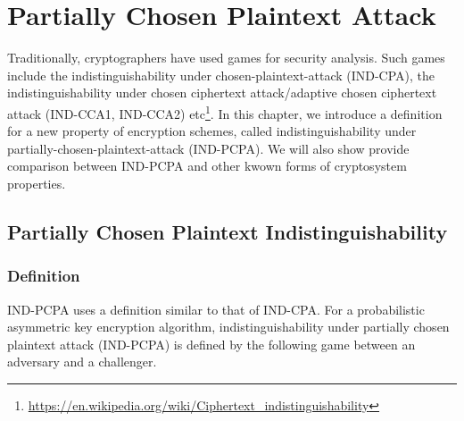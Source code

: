 \chapter{Partially Chosen Plaintext Attack}\label{ch:pcpa}

Traditionally, cryptographers have used games for security analysis. Such games include the indistinguishability under chosen-plaintext-attack (IND-CPA), the indistinguishability under chosen ciphertext attack/adaptive chosen ciphertext attack (IND-CCA1, IND-CCA2) etc\footnote{\url{https://en.wikipedia.org/wiki/Ciphertext_indistinguishability}}. In this chapter, we introduce a definition for a new property of encryption schemes, called indistinguishability under partially-chosen-plaintext-attack (IND-PCPA). We will also show provide comparison between IND-PCPA and other kwown forms of cryptosystem properties.

\section{Partially Chosen Plaintext Indistinguishability}\label{sec:indpcpa}

\subsection{Definition}
IND-PCPA uses a definition similar to that of IND-CPA. For a probabilistic asymmetric key encryption algorithm, indistinguishability under partially chosen plaintext attack (IND-PCPA) is defined by the following game between an adversary and a challenger.


